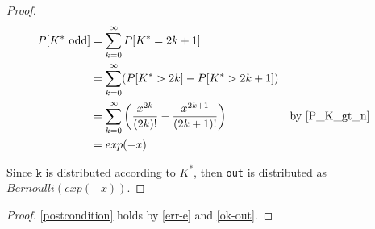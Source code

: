 \documentclass{article}
\begin{document}
\begin{proof}
    \begin{align*}
        P[K^{*} \text{ odd}] &= \sum_{k=0}^\infty P[K^{*} = 2k + 1] \\
        &= \sum_{k=0}^\infty (P[K^{*} > 2k] - P[K^{*} > 2k + 1]) \\
        &= \sum_{k=0}^\infty \left(\frac{x^{2k}}{(2k)!} - \frac{x^{2k + 1}}{(2k + 1)!}\right) && \text{by } \ref{P_K_gt_n} \\
        &= exp(-x)
    \end{align*}

    Since $\mathtt{k}$ is distributed according to $K^{*}$, then \texttt{out} is distributed as $Bernoulli(exp(-x))$.
\end{proof}

\begin{proof}
    \ref{postcondition} holds by \ref{err-e} and \ref{ok-out}.
\end{proof}



\end{document}
